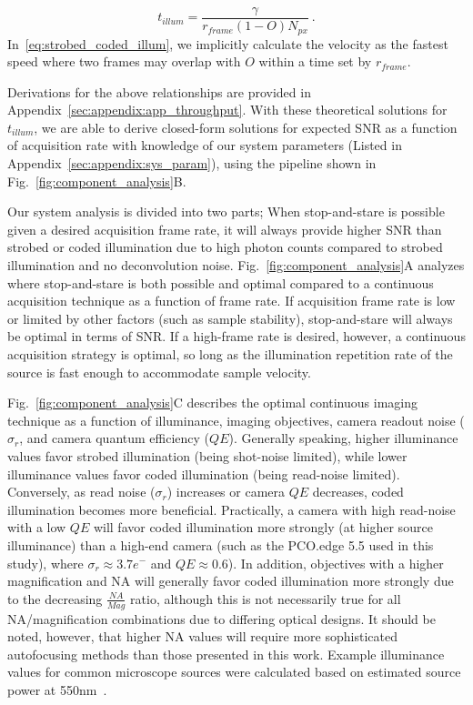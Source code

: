 \begin{equation}
\label{eq:strobed_coded_illum}
t_{illum} = \frac{\gamma}{r_{frame}(1 - O) N_{px}}\:.
\end{equation}
In~\eqref{eq:strobed_coded_illum}, we implicitly calculate the velocity as the fastest speed where two frames may overlap with $O$ within a time set by $r_{frame}$.

Derivations for the above relationships are provided in Appendix~\ref{sec:appendix:app_throughput}. With these theoretical solutions for $t_{illum}$, we are able to derive closed-form solutions for expected SNR as a function of acquisition rate with knowledge of our system parameters (Listed in Appendix~\ref{sec:appendix:sys_param}), using the pipeline shown in Fig.~\ref{fig:component_analysis}B.

Our system analysis is divided into two parts; When stop-and-stare is possible given a desired acquisition frame rate, it will always provide higher SNR than strobed or coded illumination due to high photon counts compared to strobed illumination and no deconvolution noise. Fig.~\ref{fig:component_analysis}A analyzes where stop-and-stare is both possible and optimal compared to a continuous acquisition technique as a function of frame rate. If acquisition frame rate is low or limited by other factors (such as sample stability), stop-and-stare will always be optimal in terms of SNR. If a high-frame rate is desired, however, a continuous acquisition strategy is optimal, so long as the illumination repetition rate of the source is fast enough to accommodate sample velocity.

Fig.~\ref{fig:component_analysis}C describes the optimal continuous imaging technique as a function of illuminance, imaging objectives, camera readout noise ($\sigma_r$, and camera quantum efficiency ($QE$). Generally speaking, higher illuminance values favor strobed illumination (being shot-noise limited), while lower illuminance values favor coded illumination (being read-noise limited). Conversely, as read noise ($\sigma_r$) increases or camera $QE$ decreases, coded illumination becomes more beneficial. Practically, a camera with high read-noise with a low $QE$ will favor coded illumination more strongly (at higher source illuminance) than a high-end camera (such as the PCO.edge 5.5 used in this study), where $\sigma_r \approx 3.7 e^-$ and $QE \approx 0.6$). In addition, objectives with a higher magnification and NA will generally favor coded illumination more strongly due to the decreasing $\frac{NA}{Mag}$ ratio, although this is not necessarily true for all NA/magnification combinations due to differing optical designs. It should be noted, however, that higher NA values will require more sophisticated autofocusing methods than those presented in this work. Example illuminance values for common microscope sources were calculated based on estimated source power at 550nm~\cite{illumpower}.

